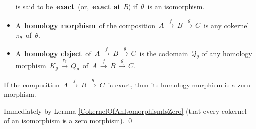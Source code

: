 \begin{definition}
\begin{itemize}
	is said to be \,\textbf{exact}\, (or, \,\textbf{exact at $B$}) if
	\,$\theta$\, is an isomorphism.
\item
	A \,\textbf{homology morphism}\, of the composition
	\,$A \,\overset{f}{\longrightarrow}\, B \,\overset{g}{\longrightarrow}\, C$\,
	is any cokernel \,$\pi_{\theta}$\, of \,$\theta$.
\item
	A \,\textbf{homology object}\, of
	\,$A \,\overset{f}{\longrightarrow}\, B \,\overset{g}{\longrightarrow}\, C$\,
	is the codomain \,$Q_{\theta}$
	of any homology morphism \,$K_{g}\,\overset{\pi_{\theta}}{\longrightarrow}\,Q_{\theta}$\,
	of
	\,$A \,\overset{f}{\longrightarrow}\, B \,\overset{g}{\longrightarrow}\, C$.
\end{itemize}
\end{definition}


\vskip 0.5cm
\begin{remark}
\mbox{}
\vskip 0.1cm
\noindent
If the composition
\,$A \,\overset{f}{\longrightarrow}\, B \,\overset{g}{\longrightarrow}\, C$\,
is exact, then its homology morphism is a zero morphism.
\end{remark}
\proof
Immediately by Lemma \ref{CokernelOfAnIsomorphismIsZero} (that every cokernel of an isomorphism is a zero morphism).
\qed


